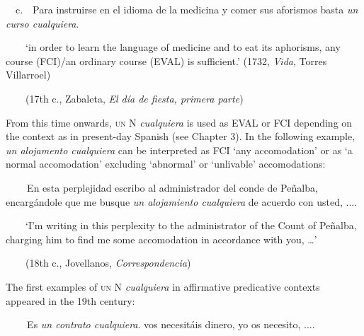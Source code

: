 \begin{styleStandard}
\ \ c.\ \ Para instruirse en el idioma de la medicina y comer sus aforismos basta \textit{un curso cualquiera}. 
\end{styleStandard}

\begin{styleStandard}
\ \ \ \ ‘in order to learn the language of medicine and to eat its aphorisms, any course (FCI)/an ordinary course (EVAL) is sufficient.’ (1732, \textit{Vida}, Torres Villarroel)
\end{styleStandard}

\begin{styleStandard}
\ \ \ \ (17th c., Zabaleta,\textit{ El día de fiesta, primera parte})
\end{styleStandard}

\begin{styleStandard}
From this time onwards, \textsc{un}\textit{ }N \textit{cualquiera} is used as EVAL or FCI depending on the context as in present-day Spanish (see Chapter 3). In the following example, \textit{un alojamento cualquiera} can be interpreted as FCI ‘any accomodation’ or as ‘a normal accomodation’ excluding ‘abnormal’ or ‘unlivable’ accomodations:
\end{styleStandard}

\begin{styleStandard}
\textbf{\ \ }\ \ En esta perplejidad escribo al administrador del conde de Peñalba, encargándole que me busque \textit{un alojamiento cualquiera} de acuerdo con usted, .... 
\end{styleStandard}

\begin{styleStandard}
\ \ \ \ ‘I’m writing in this perplexity to the administrator of the Count of Peñalba, charging him to find me some accomodation in accordance with you, …’
\end{styleStandard}

\begin{styleStandard}
\ \ \ \ (18th c., Jovellanos, \textit{Correspondencia})
\end{styleStandard}

\begin{styleStandard}
The first examples of \textsc{un} N \textit{cualquiera} in affirmative predicative contexts appeared in the 19th century:
\end{styleStandard}

\begin{styleStandard}
\textbf{\ \ }\ \ Es \textit{un contrato cualquiera}. vos necesitáis dinero, yo os necesito, ....
\end{styleStandard}

